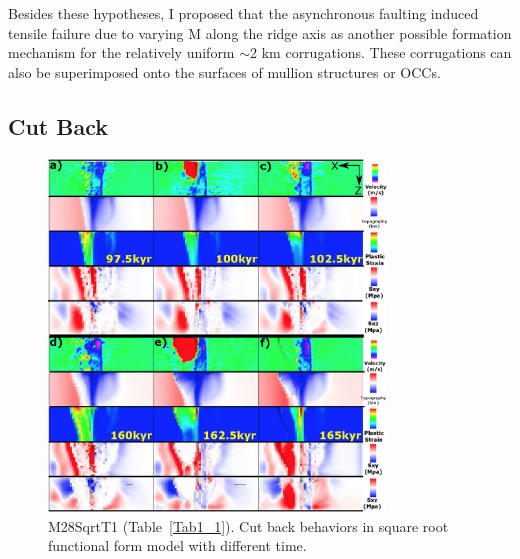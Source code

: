 Besides these hypotheses, I proposed that the asynchronous faulting induced tensile failure due to varying M along the ridge axis as another possible formation mechanism for the relatively uniform $\sim$2 km corrugations. These corrugations can also be superimposed onto the surfaces of mullion structures or OCCs.

\iffalse
\subsection{Cut Back}\label{Sec_CutBack}

\begin{figure}[h]
  \centering
    \includegraphics[width=0.8\textwidth]{./Figures/fig_Results4_4_sqrt_cut_back_with_time.eps}
  \caption{M28SqrtT1 (Table~\hyperref[Tab1_1]{\ref{Tab1_1}}). Cut back behaviors in square root functional form model with different time.}
 \label{fig_Results4_4}
\end{figure}   

